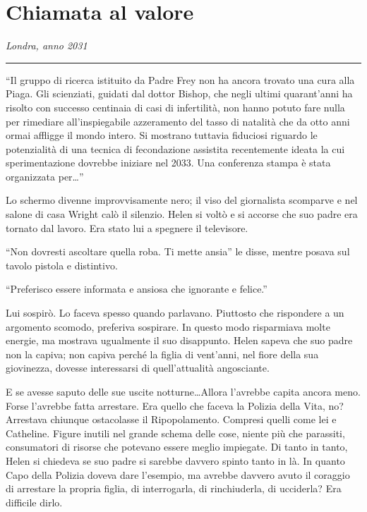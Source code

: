 \chapter{Chiamata al valore}
\label{ch:chiamata-al-valore}

\emph{Londra, anno 2031}
\plainbreak{1}

``Il gruppo di ricerca istituito da Padre Frey non ha ancora trovato una cura alla Piaga. Gli
scienziati, guidati dal dottor Bishop, che negli ultimi quarant'anni ha risolto con successo
centinaia di casi di infertilità, non hanno potuto fare nulla per rimediare all'inspiegabile
azzeramento del tasso di natalità che da otto anni ormai affligge il mondo intero. Si mostrano
tuttavia fiduciosi riguardo le potenzialità di una tecnica di fecondazione assistita recentemente
ideata la cui sperimentazione dovrebbe iniziare nel 2033. Una conferenza stampa è stata organizzata
per\dots''

Lo schermo divenne improvvisamente nero; il viso del giornalista scomparve e nel salone di casa
Wright calò il silenzio. Helen si voltò e si accorse che suo padre era tornato dal lavoro. Era stato
lui a spegnere il televisore.

``Non dovresti ascoltare quella roba. Ti mette ansia'' le disse, mentre posava sul tavolo pistola e
distintivo.

``Preferisco essere informata e ansiosa che ignorante e felice.''

Lui sospirò. Lo faceva spesso quando parlavano. Piuttosto che rispondere a un argomento scomodo,
preferiva sospirare. In questo modo risparmiava molte energie, ma mostrava ugualmente il suo
disappunto. Helen sapeva che suo padre non la capiva; non capiva perché la figlia di vent'anni, nel
fiore della sua giovinezza, dovesse interessarsi di quell'attualità angosciante.

E se avesse saputo delle sue uscite notturne\dots Allora l'avrebbe capita ancora meno. Forse
l'avrebbe fatta arrestare. Era quello che faceva la Polizia della Vita, no? Arrestava chiunque
ostacolasse il Ripopolamento. Compresi quelli come lei e Catheline. Figure inutili nel grande schema
delle cose, niente più che parassiti, consumatori di risorse che potevano essere meglio impiegate.
Di tanto in tanto, Helen si chiedeva se suo padre si sarebbe davvero spinto tanto in là. In quanto
Capo della Polizia doveva dare l'esempio, ma avrebbe davvero avuto il coraggio di arrestare la
propria figlia, di interrogarla, di rinchiuderla, di ucciderla? Era difficile dirlo.

